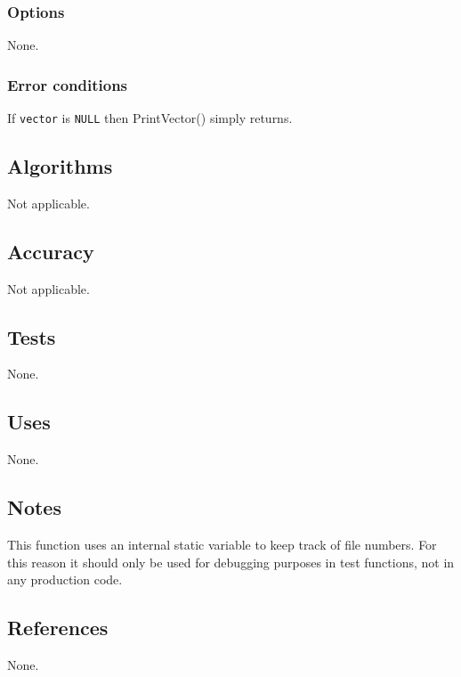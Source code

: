 \documentclass{article}
\begin{document}
\subsubsection{Options}

None. 

\subsubsection{Error conditions}


If {\tt vector} is {\tt NULL} then PrintVector() simply returns.

                                
\subsection{Algorithms}

Not applicable.


\subsection{Accuracy}


Not applicable.

\subsection{Tests}


None.

\subsection{Uses}


None.

\subsection{Notes}

This function uses an internal static variable to keep track of
file numbers.  For this reason it should only be used for debugging
purposes in test functions, not in any production code.

\subsection{References}

None.
\end{document}
